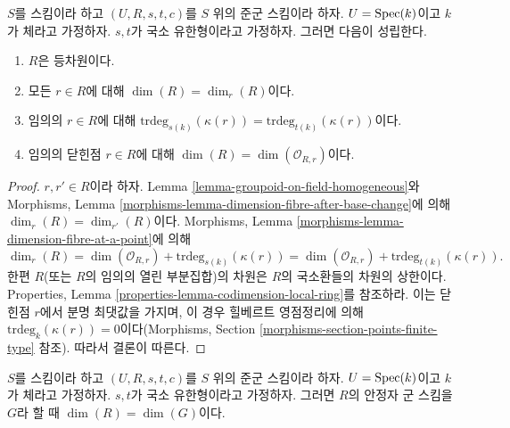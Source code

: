 \begin{lemma}
\label{lemma-groupoid-on-field-locally-finite-type-dimension}
$S$를 스킴이라 하고 $(U, R, s, t, c)$를 $S$ 위의 준군 스킴이라 하자.
$U = \mathop{\mathrm{Spec}}(k)$이고 $k$가 체라고 가정하자. $s, t$가 국소 유한형이라고
가정하자. 그러면 다음이 성립한다.
\begin{enumerate}
\item $R$은 등차원이다.
\item 모든 $r \in R$에 대해 $\dim(R) = \dim_r(R)$이다.
\item 임의의 $r \in R$에 대해
$\text{trdeg}_{s(k)}(\kappa(r)) = \text{trdeg}_{t(k)}(\kappa(r))$이다.
\item 임의의 닫힌점 $r \in R$에 대해
$\dim(R) = \dim(\mathcal{O}_{R, r})$이다.
\end{enumerate}
\end{lemma}

\begin{proof}
$r, r' \in R$이라 하자. Lemma
\ref{lemma-groupoid-on-field-homogeneous}와 Morphisms, Lemma
\ref{morphisms-lemma-dimension-fibre-after-base-change}에 의해
$\dim_r(R) = \dim_{r'}(R)$이다. Morphisms, Lemma
\ref{morphisms-lemma-dimension-fibre-at-a-point}에 의해
$$
\dim_r(R) =
\dim(\mathcal{O}_{R, r}) + \text{trdeg}_{s(k)}(\kappa(r)) =
\dim(\mathcal{O}_{R, r}) + \text{trdeg}_{t(k)}(\kappa(r)).
$$
한편 $R$(또는 $R$의 임의의 열린 부분집합)의 차원은 $R$의 국소환들의
차원의 상한이다. Properties, Lemma
\ref{properties-lemma-codimension-local-ring}를 참조하라. 이는 닫힌점 $r$에서
분명 최댓값을 가지며, 이 경우 힐베르트 영점정리에 의해
$\text{trdeg}_k(\kappa(r)) = 0$이다(Morphisms, Section
\ref{morphisms-section-points-finite-type} 참조). 따라서 결론이 따른다.
\end{proof}

\begin{lemma}
\label{lemma-groupoid-on-field-dimension-equal-stabilizer}
$S$를 스킴이라 하고 $(U, R, s, t, c)$를 $S$ 위의 준군 스킴이라 하자.
$U = \mathop{\mathrm{Spec}}(k)$이고 $k$가 체라고 가정하자. $s, t$가 국소 유한형이라고
가정하자. 그러면 $R$의 안정자 군 스킴을 $G$라 할 때
$\dim(R) = \dim(G)$이다.
\end{lemma}

